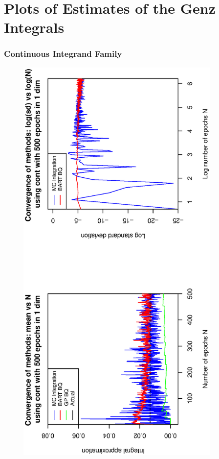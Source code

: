 \section*{Plots of Estimates of the Genz Integrals}


\subsubsection*{Continuous Integrand Family}
\vspace{-1.5cm}
\begin{figure}[H]
  \centering
  \hspace{-1.6cm}
  \begin{minipage}[b]{0.4\textwidth}
  \captionsetup{justification=centering}
    \includegraphics[width = 0.9\textwidth, angle = -90]{report/Figures/1/convergenceMean11Dimensions.eps}

\end{minipage}
\end{figure}

